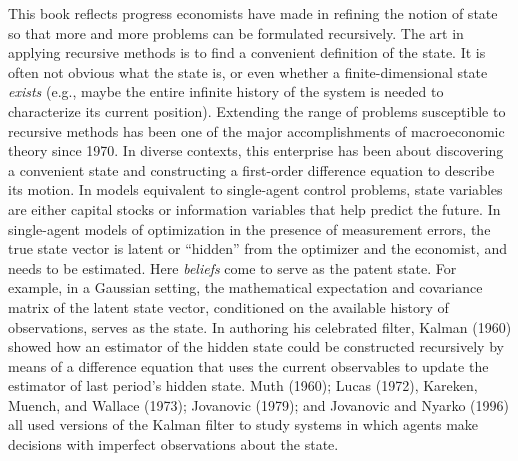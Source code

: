 
  \noindent This book reflects progress economists
have made in refining the notion of state so that more and
more problems can be formulated recursively.
  The art in applying recursive methods is to find a convenient definition
of the  state.  It is often not obvious what the
state is, or even whether a finite-dimensional
 state {\it exists} (e.g., maybe the entire infinite
history of the system is needed to characterize  its current
position).
Extending the range of problems susceptible to
recursive methods has been one of the major
accomplishments of macroeconomic theory since 1970.
 In diverse contexts, this enterprise
 has been about  discovering a convenient
state  and constructing a first-order difference equation to
describe its motion. In models equivalent to  single-agent control
problems, state variables are either capital stocks or information
variables that help predict the future.
%
  In single-agent
 models of optimization
in the presence of measurement errors, the true state vector is
latent or  ``hidden'' from the optimizer and the economist, and
needs to be  estimated. Here {\it beliefs} come to  serve as the
patent state. For example, in a Gaussian setting, the mathematical
expectation and covariance matrix of the  latent state vector,
conditioned on the available history of observations, serves as
the state. In authoring  his celebrated filter, Kalman (1960)
showed how an estimator of the hidden state could be constructed
recursively by means of a difference equation that uses the
current observables to update the estimator of last period's
hidden state. Muth
(1960); Lucas (1972), Kareken, Muench, and Wallace (1973);
Jovanovic (1979);  and Jovanovic and Nyarko (1996)  all used
versions   of the Kalman filter to study systems in which agents
make decisions with imperfect observations about the state.

